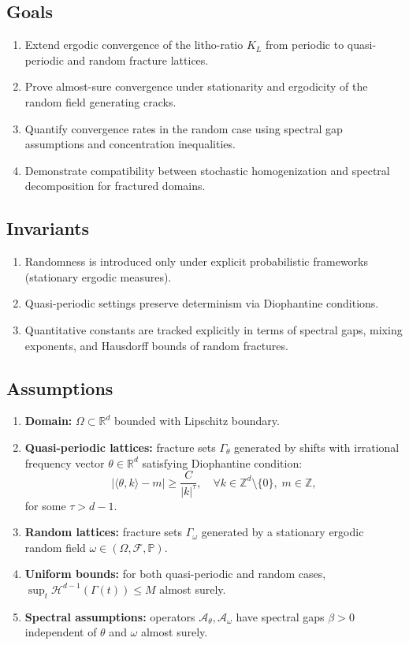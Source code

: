 \subsection*{Goals}
\begin{enumerate}[label=G\arabic*]
  \item Extend ergodic convergence of the litho-ratio $K_L$ from periodic
  to quasi-periodic and random fracture lattices.
  \item Prove almost-sure convergence under stationarity and ergodicity of
  the random field generating cracks.
  \item Quantify convergence rates in the random case using spectral gap
  assumptions and concentration inequalities.
  \item Demonstrate compatibility between stochastic homogenization
  and spectral decomposition for fractured domains.
\end{enumerate}

\subsection*{Invariants}
\begin{enumerate}[label=I\arabic*]
  \item Randomness is introduced only under explicit probabilistic frameworks
  (stationary ergodic measures).
  \item Quasi-periodic settings preserve determinism via Diophantine conditions.
  \item Quantitative constants are tracked explicitly in terms of spectral
  gaps, mixing exponents, and Hausdorff bounds of random fractures.
\end{enumerate}

\subsection*{Assumptions}
\begin{enumerate}[label=H\arabic*]
  \item \textbf{Domain:} $\Omega \subset \mathbb{R}^d$ bounded with Lipschitz
  boundary.
  \item \textbf{Quasi-periodic lattices:} fracture sets $\Gamma_\theta$
  generated by shifts with irrational frequency vector $\theta \in \mathbb{R}^d$
  satisfying Diophantine condition:
  \[
  | \langle \theta, k \rangle - m | \geq \frac{C}{|k|^\tau}, \quad
  \forall k \in \mathbb{Z}^d\setminus\{0\}, \; m \in \mathbb{Z},
  \]
  for some $\tau > d-1$.
  \item \textbf{Random lattices:} fracture sets $\Gamma_\omega$ generated by
  a stationary ergodic random field $\omega \in (\Omega, \mathcal{F}, \mathbb{P})$.
  \item \textbf{Uniform bounds:} for both quasi-periodic and random cases,
  $\sup_t \mathcal{H}^{d-1}(\Gamma(t)) \leq M$ almost surely.
  \item \textbf{Spectral assumptions:} operators
  $\mathcal{A}_\theta, \mathcal{A}_\omega$ have spectral gaps $\beta > 0$
  independent of $\theta$ and $\omega$ almost surely.
\end{enumerate}


